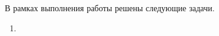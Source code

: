 \Conclusion %

В рамках выполнения работы решены следующие задачи.

\begin{enumerate}
	\item
\end{enumerate}

